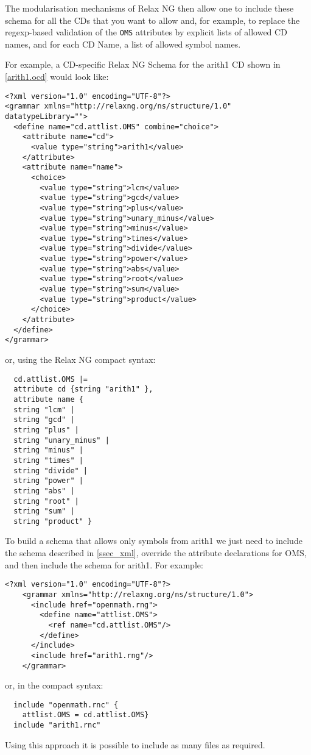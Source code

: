 \begin{appendix}
The modularisation mechanisms of Relax NG then allow one to include these schema for all
the CDs that you want to allow and, for example, to replace the regexp-based validation of
the \lstinline|OMS| attributes by explicit lists of allowed CD names, and for each CD
Name, a list of allowed symbol names.
  
    For example, a CD-specific Relax NG Schema for the arith1 CD shown in
    \ref{arith1.ocd} would look like:
\begin{lstlisting}
<?xml version="1.0" encoding="UTF-8"?>
<grammar xmlns="http://relaxng.org/ns/structure/1.0" datatypeLibrary="">
  <define name="cd.attlist.OMS" combine="choice">
    <attribute name="cd">
      <value type="string">arith1</value>
    </attribute>
    <attribute name="name">
      <choice>
        <value type="string">lcm</value>
        <value type="string">gcd</value>
        <value type="string">plus</value>
        <value type="string">unary_minus</value>
        <value type="string">minus</value>
        <value type="string">times</value>
        <value type="string">divide</value>
        <value type="string">power</value>
        <value type="string">abs</value>
        <value type="string">root</value>
        <value type="string">sum</value>
        <value type="string">product</value>
      </choice>
    </attribute>
  </define>
</grammar>
\end{lstlisting}
or, using the Relax NG compact syntax:
\begin{lstlisting}
  cd.attlist.OMS |= 
  attribute cd {string "arith1" },
  attribute name {
  string "lcm" |
  string "gcd" |
  string "plus" |
  string "unary_minus" |
  string "minus" |
  string "times" |
  string "divide" |
  string "power" |
  string "abs" |
  string "root" |
  string "sum" |
  string "product" }
\end{lstlisting}

 To build a schema that allows only symbols from arith1 we just
  need to include the \OM schema described in \ref{ssec_xml}, override the attribute declarations for
  OMS, and then include the schema for arith1.  For example:
\begin{lstlisting}
<?xml version="1.0" encoding="UTF-8"?>
    <grammar xmlns="http://relaxng.org/ns/structure/1.0">
      <include href="openmath.rng">
        <define name="attlist.OMS">
          <ref name="cd.attlist.OMS"/>
        </define>
      </include>
      <include href="arith1.rng"/>
    </grammar>
\end{lstlisting}
    or, in the compact syntax:
\begin{lstlisting}
  include "openmath.rnc" {
    attlist.OMS = cd.attlist.OMS}
  include "arith1.rnc"
\end{lstlisting}
Using this approach it is possible to include as many files as required.


\end{appendix}
